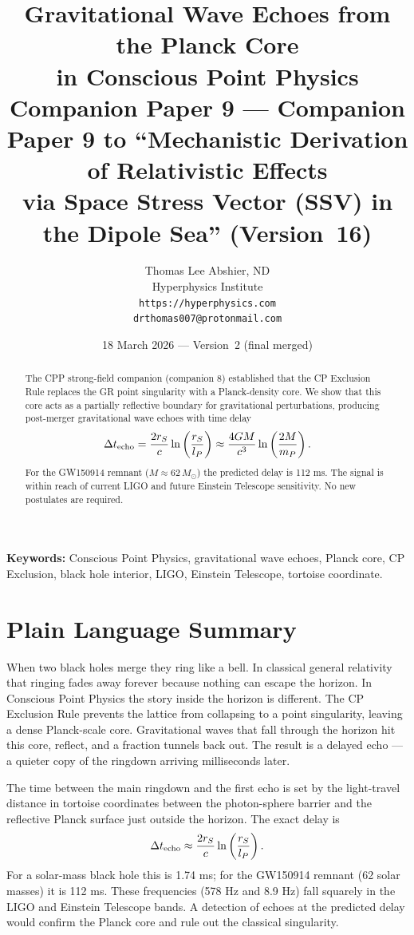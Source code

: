 \documentclass[12pt]{article}
\title{\textbf{Gravitational Wave Echoes from the Planck Core\\
in Conscious Point Physics}\\[6pt]
{\large Companion Paper 9 ---
Companion Paper 9 to ``Mechanistic Derivation of Relativistic Effects\\
via Space Stress Vector (SSV) in the Dipole Sea'' (Version~16)}}
\author{Thomas Lee Abshier, ND\\
Hyperphysics Institute\\
\texttt{https://hyperphysics.com}\\
\texttt{drthomas007@protonmail.com}}
\date{18 March 2026 --- Version~2 (final merged)}
\newcommand{\Dt}{\Delta t_{\rm echo}}
\begin{document}
\maketitle

\noindent\textbf{Keywords:} Conscious Point Physics, gravitational wave echoes, Planck core, CP Exclusion, black hole interior, LIGO, Einstein Telescope, tortoise coordinate.

\section*{Plain Language Summary}

When two black holes merge they ring like a bell. In classical general relativity that ringing fades away forever because nothing can escape the horizon. In Conscious Point Physics the story inside the horizon is different. The CP Exclusion Rule prevents the lattice from collapsing to a point singularity, leaving a dense Planck-scale core. Gravitational waves that fall through the horizon hit this core, reflect, and a fraction tunnels back out. The result is a delayed echo — a quieter copy of the ringdown arriving milliseconds later.

The time between the main ringdown and the first echo is set by the light-travel distance in tortoise coordinates between the photon-sphere barrier and the reflective Planck surface just outside the horizon. The exact delay is
\[
\Dt \approx \frac{2 r_S}{c} \ln\left(\frac{r_S}{l_P}\right).
\]
For a solar-mass black hole this is 1.74 ms; for the GW150914 remnant (62 solar masses) it is 112 ms. These frequencies (578 Hz and 8.9 Hz) fall squarely in the LIGO and Einstein Telescope bands. A detection of echoes at the predicted delay would confirm the Planck core and rule out the classical singularity.

\begin{abstract}
The CPP strong-field companion (companion 8) established that the CP Exclusion Rule replaces the GR point singularity with a Planck-density core. We show that this core acts as a partially reflective boundary for gravitational perturbations, producing post-merger gravitational wave echoes with time delay
\[
\Dt = \frac{2 r_S}{c} \ln\left(\frac{r_S}{l_P}\right) \approx \frac{4 G M}{c^3} \ln\left(\frac{2 M}{m_P}\right).
\]
For the GW150914 remnant (\(M \approx 62\,M_\odot\)) the predicted delay is 112 ms. The signal is within reach of current LIGO and future Einstein Telescope sensitivity. No new postulates are required.
\end{abstract}
\end{document}
